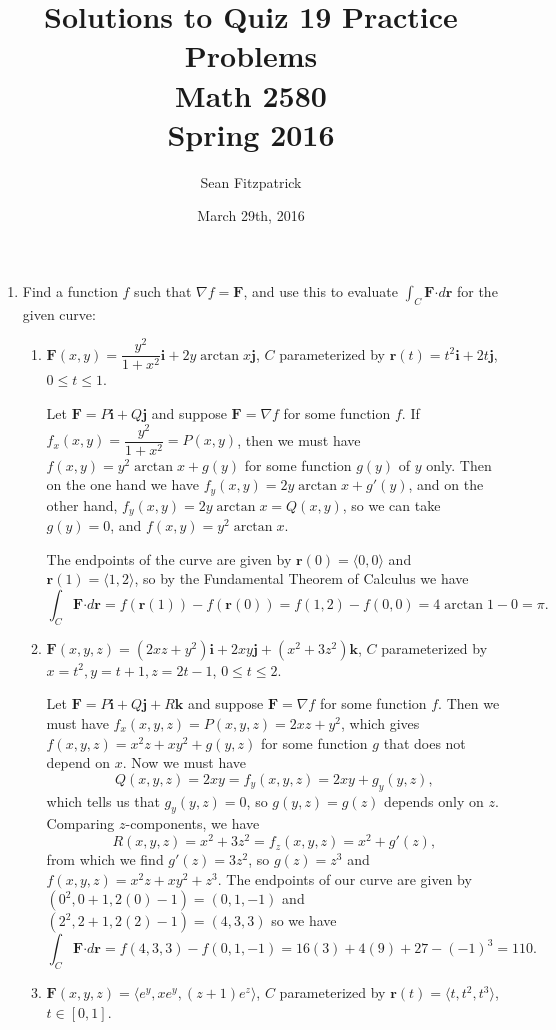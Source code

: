 \documentclass[letterpaper,12pt]{article}
\title{Solutions to Quiz 19 Practice Problems\\Math 2580\\Spring 2016}
\author{Sean Fitzpatrick}
\date{March 29th, 2016}
\renewcommand{\i}{\mathbf{i}}
\renewcommand{\j}{\mathbf{j}}
\renewcommand{\k}{\mathbf{k}}
\renewcommand{\r}{\mathbf{r}}
\newcommand{\dotp}{\boldsymbol{\cdot}}
\newcommand{\F}{\mathbf{F}}
\begin{document}
 \maketitle

\begin{enumerate}
 \item Find a function $f$ such that $\nabla f = \F$, and use this to evaluate $\int_C \F\dotp d\r$ for the given curve:
\begin{enumerate}
 \item $\F(x,y) = \dfrac{y^2}{1+x^2}\i + 2y\arctan x\j$, $C$ parameterized by $\r(t) = t^2\i+2t\j$, $0\leq t\leq 1$.

\bigskip

Let $\F=P\i+Q\j$ and suppose $\F = \nabla f$ for some function $f$. If $f_x(x,y) = \dfrac{y^2}{1+x^2} = P(x,y)$, then we must have $f(x,y) = y^2\arctan x + g(y)$ for some function $g(y)$ of $y$ only. Then on the one hand we have $f_y(x,y) = 2y\arctan x +g'(y)$, and on the other hand, $f_y(x,y) = 2y\arctan x = Q(x,y)$, so we can take $g(y)=0$, and $f(x,y)=y^2\arctan x$.

The endpoints of the curve are given by $\r(0) = \langle 0,0\rangle$ and $\r(1) = \langle 1, 2\rangle$, so by the Fundamental Theorem of Calculus we have
\[
 \int_C \F\dotp d\r = f(\r(1))-f(\r(0)) = f(1,2)-f(0,0) = 4\arctan 1 - 0 = \pi.
\]



 \item $\F(x,y,z) = (2xz+y^2)\i+2xy\j + (x^2+3z^2)\k$, $C$ parameterized by $x=t^2, y=t+1, z=2t-1$, $0\leq t\leq 2$.

\bigskip

Let $\F = P\i+Q\j+R\k$ and suppose $\F = \nabla f$ for some function $f$. Then we must have $f_x(x,y,z) = P(x,y,z) = 2xz+y^2$, which gives $f(x,y,z) = x^2z+xy^2+g(y,z)$ for some function $g$ that does not depend on $x$. Now we must have
\[
 Q(x,y,z) = 2xy = f_y(x,y,z) = 2xy+g_y(y,z),
\]
which tells us that $g_y(y,z)=0$, so $g(y,z)=g(z)$ depends only on $z$. Comparing $z$-components, we have
\[
 R(x,y,z) = x^2+3z^2 = f_z(x,y,z) = x^2+g'(z),
\]
from which we find $g'(z) = 3z^2$, so $g(z)=z^3$ and $f(x,y,z) = x^2z+xy^2+z^3$. The endpoints of our curve are given by $(0^2, 0+1, 2(0)-1) = (0,1,-1)$ and $(2^2, 2+1, 2(2)-1) = (4,3,3)$ so we have
\[
 \int_C \F\dotp d\r = f(4,3,3)-f(0,1,-1) = 16(3)+4(9)+27-(-1)^3 = 110.
\]

 \item $\F(x,y,z) = \langle e^y, xe^y, (z+1)e^z\rangle$, $C$ parameterized by $\r(t) = \langle t, t^2, t^3\rangle$, $t\in [0,1]$.


\end{enumerate}
\end{enumerate}
\end{document}
